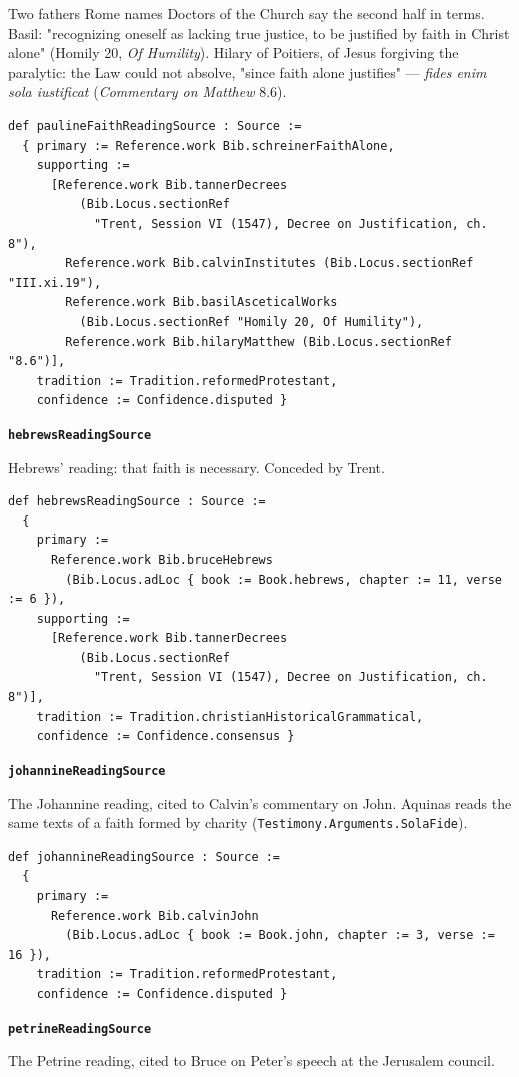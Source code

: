 \documentclass[11pt]{article}
\begin{document}
Two fathers Rome names Doctors of the Church say the second half in terms. Basil: "recognizing oneself as lacking true justice, to be justified by faith in Christ alone" (Homily 20, \emph{Of Humility}). Hilary of Poitiers, of Jesus forgiving the paralytic: the Law could not absolve, "since faith alone justifies" — \emph{fides enim sola iustificat} (\emph{Commentary on Matthew} 8.6).

{\small\begin{verbatim}
def paulineFaithReadingSource : Source :=
  { primary := Reference.work Bib.schreinerFaithAlone,
    supporting :=
      [Reference.work Bib.tannerDecrees
          (Bib.Locus.sectionRef
            "Trent, Session VI (1547), Decree on Justification, ch. 8"),
        Reference.work Bib.calvinInstitutes (Bib.Locus.sectionRef "III.xi.19"),
        Reference.work Bib.basilAsceticalWorks
          (Bib.Locus.sectionRef "Homily 20, Of Humility"),
        Reference.work Bib.hilaryMatthew (Bib.Locus.sectionRef "8.6")],
    tradition := Tradition.reformedProtestant,
    confidence := Confidence.disputed }
\end{verbatim}}
\par\medskip\noindent\textbf{\texttt{hebrews\allowbreak{}Reading\allowbreak{}Source}}\par\nobreak\noindent
Hebrews' reading: that faith is necessary. Conceded by Trent.

{\small\begin{verbatim}
def hebrewsReadingSource : Source :=
  {
    primary :=
      Reference.work Bib.bruceHebrews
        (Bib.Locus.adLoc { book := Book.hebrews, chapter := 11, verse := 6 }),
    supporting :=
      [Reference.work Bib.tannerDecrees
          (Bib.Locus.sectionRef
            "Trent, Session VI (1547), Decree on Justification, ch. 8")],
    tradition := Tradition.christianHistoricalGrammatical,
    confidence := Confidence.consensus }
\end{verbatim}}
\par\medskip\noindent\textbf{\texttt{johannine\allowbreak{}Reading\allowbreak{}Source}}\par\nobreak\noindent
The Johannine reading, cited to Calvin's commentary on John. Aquinas reads the same texts of a faith formed by charity (\texttt{Testimony.Arguments.Sola\allowbreak{}Fide}).

{\small\begin{verbatim}
def johannineReadingSource : Source :=
  {
    primary :=
      Reference.work Bib.calvinJohn
        (Bib.Locus.adLoc { book := Book.john, chapter := 3, verse := 16 }),
    tradition := Tradition.reformedProtestant,
    confidence := Confidence.disputed }
\end{verbatim}}
\par\medskip\noindent\textbf{\texttt{petrine\allowbreak{}Reading\allowbreak{}Source}}\par\nobreak\noindent
The Petrine reading, cited to Bruce on Peter's speech at the Jerusalem council.
\end{document}
